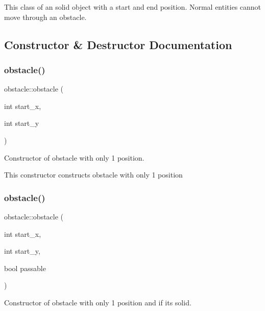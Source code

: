 This class of an solid object with a start and end position. Normal entities cannot move through an obstacle. 

\subsection{Constructor \& Destructor Documentation}
\mbox{\label{classobstacle_ac5d3684c209786d12571f8ad09445ffc}} 
\subsubsection{\texorpdfstring{obstacle()}{obstacle()}\hspace{0.1cm}{\footnotesize\ttfamily [1/4]}}
{\footnotesize\ttfamily obstacle\+::obstacle (\begin{DoxyParamCaption}\item[{int}]{start\+\_\+x,  }\item[{int}]{start\+\_\+y }\end{DoxyParamCaption})\hspace{0.3cm}{\ttfamily [inline]}}



Constructor of obstacle with only 1 position. 

This constructor constructs obstacle with only 1 position \mbox{\label{classobstacle_af3e8b2149760b57bb9238f03bd1616b7}} 
\subsubsection{\texorpdfstring{obstacle()}{obstacle()}\hspace{0.1cm}{\footnotesize\ttfamily [2/4]}}
{\footnotesize\ttfamily obstacle\+::obstacle (\begin{DoxyParamCaption}\item[{int}]{start\+\_\+x,  }\item[{int}]{start\+\_\+y,  }\item[{bool}]{passable }\end{DoxyParamCaption})\hspace{0.3cm}{\ttfamily [inline]}}



Constructor of obstacle with only 1 position and if it\textquotesingle{}s solid. 


